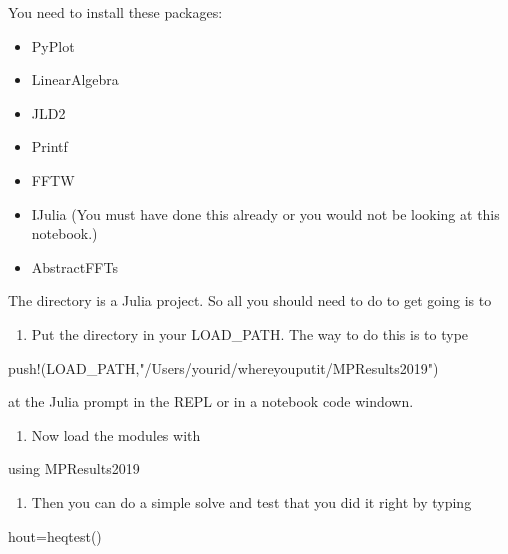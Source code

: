 \documentclass[11pt]{article}
\providecommand{\tightlist}{%
      \setlength{\itemsep}{0pt}\setlength{\parskip}{0pt}}
\newenvironment{Shaded}{}{}
\newcommand{\FloatTok}[1]{\textcolor[rgb]{0.25,0.63,0.44}{{#1}}}
\newcommand{\StringTok}[1]{\textcolor[rgb]{0.25,0.44,0.63}{{#1}}}
\newcommand{\NormalTok}[1]{{#1}}
\begin{document}
You need to install these packages:

\begin{itemize}
\tightlist
\item
  PyPlot
\item
  LinearAlgebra
\item
  JLD2
\item
  Printf
\item
  FFTW
\item
  IJulia (You must have done this already or you would not be looking at
  this notebook.)
\item
  AbstractFFTs
\end{itemize}

The directory is a Julia project. So all you should need to do to get
going is to

\begin{enumerate}
\def\labelenumi{\arabic{enumi}.}
\tightlist
\item
  Put the directory in your LOAD\_PATH. The way to do this is to type
\end{enumerate}

\begin{Shaded}
\begin{Highlighting}[]
\NormalTok{push!(LOAD_PATH,}\StringTok{"/Users/yourid/whereyouputit/MPResults2019"}\NormalTok{)}
\end{Highlighting}
\end{Shaded}

at the Julia prompt in the REPL or in a notebook code windown.

\begin{enumerate}
\def\labelenumi{\arabic{enumi}.}
\setcounter{enumi}{1}
\tightlist
\item
  Now load the modules with
\end{enumerate}

\begin{Shaded}
\begin{Highlighting}[]
\NormalTok{using MPResults}\FloatTok{2019}
\end{Highlighting}
\end{Shaded}

\begin{enumerate}
\def\labelenumi{\arabic{enumi}.}
\setcounter{enumi}{2}
\tightlist
\item
  Then you can do a simple solve and test that you did it right by
  typing
\end{enumerate}

\begin{Shaded}
\begin{Highlighting}[]
\NormalTok{hout=heqtest()}
\end{Highlighting}
\end{Shaded}
\end{document}
